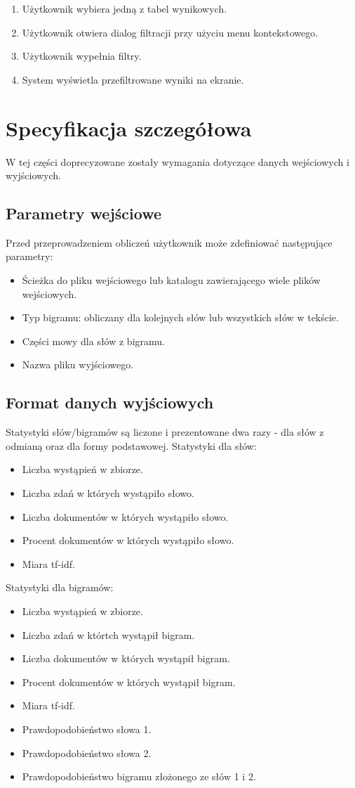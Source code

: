 \documentclass[11pt]{article}
\begin{document}
\begin{enumerate}
 \item Użytkownik wybiera jedną z tabel wynikowych.
 \item Użytkownik otwiera dialog filtracji przy użyciu menu kontekstowego.
 \item Użytkownik wypełnia filtry.
 \item System wyświetla przefiltrowane wyniki na ekranie.
\end{enumerate}

\section{Specyfikacja szczegółowa}
W tej części doprecyzowane zostały wymagania dotyczące danych wejściowych i wyjściowych.
\subsection{Parametry wejściowe}
Przed przeprowadzeniem obliczeń użytkownik może zdefiniować następujące parametry:
\begin{itemize}
 \item Ścieżka do pliku wejściowego lub katalogu zawierającego wiele plików wejściowych.
 \item Typ bigramu: obliczany dla kolejnych słów lub wszystkich słów w tekście.
 \item Części mowy dla słów z bigramu.
 \item Nazwa pliku wyjściowego.
\end{itemize}

\subsection{Format danych wyjściowych}
Statystyki słów/bigramów są liczone i prezentowane dwa razy - dla słów z odmianą oraz dla formy podstawowej.
Statystyki dla słów:
\begin{itemize}
 \item Liczba wystąpień w zbiorze.
 \item Liczba zdań w których wystąpiło słowo.
 \item Liczba dokumentów w których wystąpiło słowo.
 \item Procent dokumentów w których wystąpiło słowo.
 \item Miara tf-idf.
\end{itemize}

Statystyki dla bigramów:
\begin{itemize}
 \item Liczba wystąpień w zbiorze.
 \item Liczba zdań w którtch wystąpił bigram.
 \item Liczba dokumentów w których wystąpił bigram.
 \item Procent dokumentów w których wystąpił bigram.
 \item Miara tf-idf.
 \item Prawdopodobieństwo słowa 1.
 \item Prawdopodobieństwo słowa 2.
 \item Prawdopodobieństwo bigramu złożonego ze słów 1 i 2.
\end{itemize}
\end{document}
